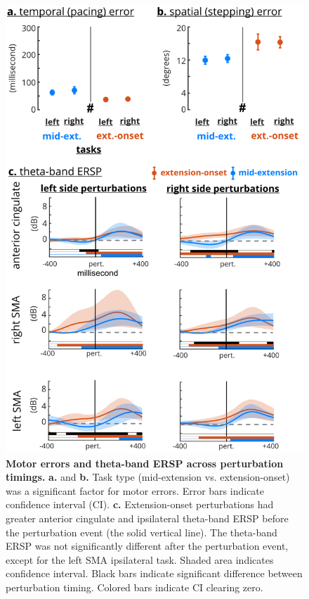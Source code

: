 \documentclass[../thesis_seyed.tex]{subfiles}
\begin{document}
\begin{figure}[H]
\centerline{\includegraphics{../img/hyp3 - perturb timing-fdr.jpg}}
\caption{\textbf{Motor errors and theta-band ERSP across perturbation timings.} \textbf{a.} and \textbf{b.} Task type (mid-extension vs. extension-onset) was a significant factor for motor errors. Error bars indicate confidence interval (CI). \textbf{c.} Extension-onset perturbations had greater anterior cingulate and ipsilateral theta-band ERSP before the perturbation event (the solid vertical line). The theta-band ERSP was not significantly different after the perturbation event, except for the left SMA ipsilateral task. Shaded area indicates confidence interval. Black bars indicate significant difference between perturbation timing. Colored bars indicate CI clearing zero.}
\label{fig:fig7}
\end{figure}
\end{document}
